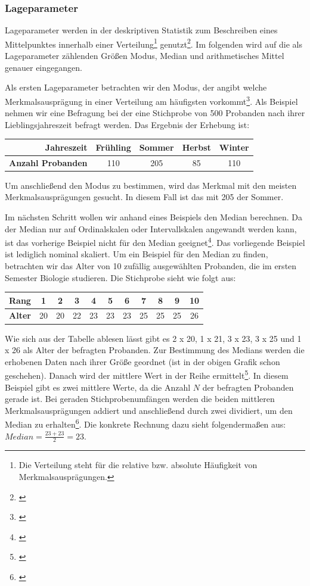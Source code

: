 \subsubsection{Lageparameter}
Lageparameter werden in der deskriptiven Statistik zum Beschreiben eines Mittelpunktes innerhalb einer Verteilung\footnote{Die Verteilung steht für die relative bzw. absolute Häufigkeit von Merkmalsausprägungen.} genutzt\footnote{\cite[vgl.][49]{Statistik2016}}. Im folgenden wird auf die als Lageparameter zählenden Größen Modus, Median und arithmetisches Mittel genauer eingegangen.

Als ersten Lageparameter betrachten wir den Modus, der angibt welche Merkmalsausprägung in einer Verteilung am häufigsten vorkommt\footnote{\cite[vgl.][53]{Statistik2016}}. Als Beispiel nehmen wir eine Befragung bei der eine Stichprobe von 500 Probanden nach ihrer Lieblingsjahreszeit befragt werden. Das Ergebnis der Erhebung ist:
\begin{center}
\begin{tabular}{r|c|c|c|c} 
\textbf{Jahreszeit} & Frühling & Sommer & Herbst & Winter \\ \hline
\textbf{Anzahl Probanden} & 110 & 205 & 85 & 110\\
\end{tabular}
\end{center}
Um anschließend den Modus zu bestimmen, wird das Merkmal mit den meisten Merkmalsausprägungen gesucht. In diesem Fall ist das mit 205 der Sommer.

Im nächsten Schritt wollen wir anhand eines Beispiels den Median berechnen. Da der Median nur auf Ordinalskalen oder Intervallskalen angewandt werden kann, ist das vorherige Beispiel nicht für den Median geeignet\footnote{\cite[vgl.][52]{Statistik2016}}. Das vorliegende Beispiel ist lediglich nominal skaliert.
Um ein Beispiel für den Median zu finden, betrachten wir das Alter von 10 zufällig ausgewählten Probanden, die im ersten Semester Biologie studieren. Die Stichprobe sieht wie folgt aus:
\begin{center}
\begin{tabular}{r|c|c|c|c|c|c|c|c|c|c} 
\textbf{Rang} & 1 & 2 & 3 & 4 & 5 & 6 & 7 & 8 & 9 & 10 \\ \hline
\textbf{Alter} & 20 & 20 & 22 & 23 & 23 & 23 & 25 & 25 & 25 & 26\\
\end{tabular}
\end{center}
Wie sich aus der Tabelle ablesen lässt gibt es 2 x 20, 1 x 21, 3 x 23, 3 x 25 und 1 x 26 als Alter der befragten Probanden. Zur Bestimmung des Medians werden die erhobenen Daten nach ihrer Größe geordnet (ist in der obigen Grafik schon geschehen). Danach wird der mittlere Wert in der Reihe ermittelt\footnote{\cite[vgl.][52\psq]{Statistik2016}}. In diesem Beispiel gibt es zwei mittlere Werte, da die Anzahl $N$ der befragten Probanden gerade ist. Bei geraden Stichprobenumfängen werden die beiden mittleren Merkmalsausprägungen addiert und anschließend durch zwei dividiert, um den Median zu erhalten\footnote{\cite[vgl.][53]{Statistik2016}}. Die konkrete Rechnung dazu sieht folgendermaßen aus: $Median = \frac{23 + 23}{2} = 23$.

